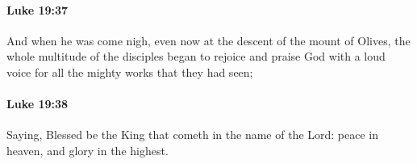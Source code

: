 		\paragraph{Luke 19:37} %
			\label{LUKE-19-37}

			And when he was come nigh, even now at the descent of the mount of Olives, the whole multitude of the disciples began to rejoice and praise God with a loud voice for all the mighty works that they had seen;
			
			\begin{framed}
			\scriptsize
				\begin{compactdesc}
					\item[SBLG] 
				\end{compactdesc}
			\end{framed}

		\paragraph{Luke 19:38} %
			\label{LUKE-19-38}

			Saying, Blessed be the King that cometh in the name of the Lord: peace in heaven, and glory in the highest.

